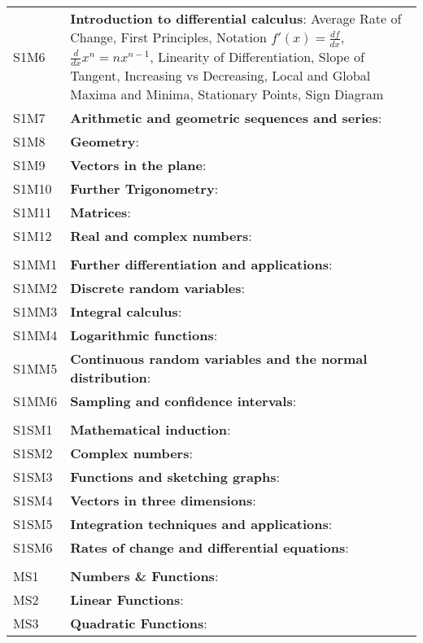 \documentclass[varwidth=144mm, 12pt]{standalone}
\begin{document}
\begin{longtable}{lp{}}
S1M6 & \textbf{Introduction to differential calculus}: Average Rate of Change, First Principles, Notation $f'(x) = \frac{df}{dx}$, $\frac{d}{dx}x^n = nx^{n-1}$, Linearity of Differentiation, Slope of Tangent, Increasing vs Decreasing, Local and Global Maxima and Minima, Stationary Points, Sign Diagram \\
S1M7 & \textbf{Arithmetic and geometric sequences and series}: \\
S1M8 & \textbf{Geometry}: \\
S1M9 & \textbf{Vectors in the plane}: \\
S1M10 & \textbf{Further Trigonometry}: \\
S1M11 & \textbf{Matrices}: \\
S1M12 & \textbf{Real and complex numbers}: \\
& \\
S1MM1 & \textbf{Further differentiation and applications}: \\
S1MM2 & \textbf{Discrete random variables}: \\
S1MM3 & \textbf{Integral calculus}: \\
S1MM4 & \textbf{Logarithmic functions}: \\
S1MM5 & \textbf{Continuous random variables and the normal distribution}: \\
S1MM6 & \textbf{Sampling and confidence intervals}: \\
& \\
S1SM1 & \textbf{Mathematical induction}: \\
S1SM2 & \textbf{Complex numbers}: \\
S1SM3 & \textbf{Functions and sketching graphs}: \\
S1SM4 & \textbf{Vectors in three dimensions}: \\
S1SM5 & \textbf{Integration techniques and applications}: \\
S1SM6 & \textbf{Rates of change and differential equations}: \\
& \\
MS1 & \textbf{Numbers \& Functions}: \\
MS2 & \textbf{Linear Functions}: \\
MS3 & \textbf{Quadratic Functions}: \\

\end{longtable}
\end{document}
